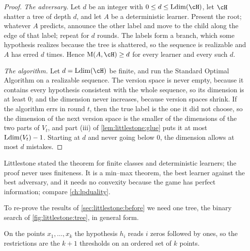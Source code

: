 \begin{refsection}
\begin{proof}
\emph{The adversary.} Let $d$ be an integer with $0\le d\le\littlestoneLdim(\cH)$, let $\cH$ shatter a tree of depth $d$, and let $A$ be a deterministic learner. Present the root; whatever $A$ predicts, announce the other label and move to the child along the edge of that label; repeat for $d$ rounds. The labels form a branch, which some hypothesis realizes because the tree is shattered, so the sequence is realizable and $A$ has erred $d$ times. Hence $\littlestoneM(A,\cH)\ge d$ for every learner and every such $d$.

\emph{The algorithm.} Let $d=\littlestoneLdim(\cH)$ be finite, and run the Standard Optimal Algorithm on a realizable sequence. The version space is never empty, because it contains every hypothesis consistent with the whole sequence, so its dimension is at least $0$; and the dimension never increases, because version spaces shrink. If the algorithm errs in round $t$, then the true label is the one it did not choose, so the dimension of the next version space is the smaller of the dimensions of the two parts of $V_t$, and part (iii) of \cref{lem:littlestone:glue} puts it at most $\operatorname{Ldim}(V_t)-1$. Starting at $d$ and never going below $0$, the dimension allows at most $d$ mistakes.
\end{proof}

Littlestone stated the theorem for finite classes and deterministic learners; the proof never uses finiteness. It is a min--max theorem, the best learner against the best adversary, and it needs no convexity because the game has perfect information; compare \cref{ch:lpduality}.

To re-prove the results of \cref{sec:littlestone:before} we need one tree, the binary search of \cref{fig:littlestone:tree}, in general form.


On the points $x_1,\dots,x_k$ the hypothesis $h_i$ reads $i$ zeros followed by ones, so the restrictions are the $k+1$ thresholds on an ordered set of $k$ points.


\end{refsection}
